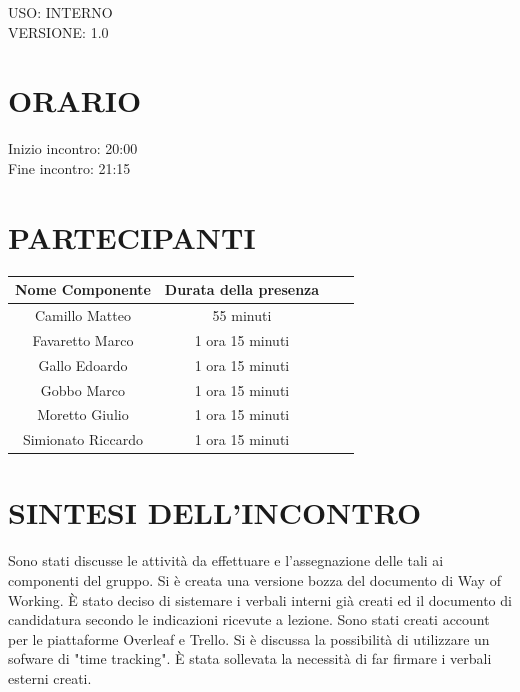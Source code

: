 \documentclass[5pt]{article}
\begin{document}
\begin{flushright}
    \begin{spacing}{1}
        USO: INTERNO\\
        VERSIONE: 1.0\\
    \end{spacing}
\end{flushright}


\restoregeometry

\pagebreak



\section{\Large ORARIO}
\begin{spacing}{1.5}
    {\large Inizio incontro: 20:00}\\
    {\large Fine incontro: 21:15}
\end{spacing}

\section{PARTECIPANTI}
\setlength\cellspacetoplimit{6pt}
\setlength\cellspacebottomlimit{6pt}

\begin{table}[ht]
  \begin{tabular}{|Sc|Sc|}
    \hline
    \textbf{Nome Componente} & \textbf{Durata della presenza} \\
    \hline
    Camillo Matteo & 55 minuti \\
    Favaretto Marco & 1 ora 15 minuti \\
    Gallo Edoardo & 1 ora 15 minuti \\
    Gobbo Marco & 1 ora 15 minuti \\
    Moretto Giulio & 1 ora 15 minuti \\
    Simionato Riccardo & 1 ora 15 minuti \\
    \hline
  \end{tabular}
  \label{tab:conference}
\end{table}

\section{SINTESI DELL'INCONTRO}
Sono stati discusse le attività da effettuare e l'assegnazione delle tali ai componenti del gruppo.
Si è creata una versione bozza del documento di Way of Working. 
È stato deciso di sistemare i verbali interni già creati ed il documento di candidatura secondo le indicazioni ricevute a lezione.
Sono stati creati account per le piattaforme Overleaf e Trello. Si è discussa la possibilità di utilizzare un sofware di "time tracking".
È stata sollevata la necessità di far firmare i verbali esterni creati.
\end{document}

